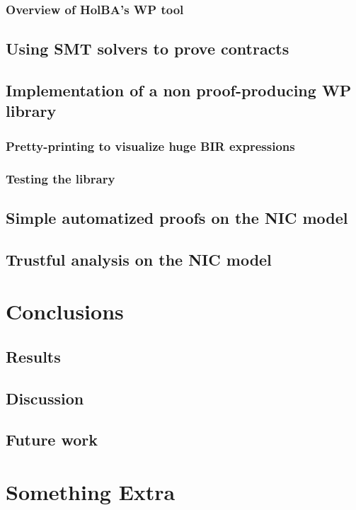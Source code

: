 \documentclass{kththesis}
\begin{document}


\subsection{Overview of HolBA's WP tool}

\section{Using SMT solvers to prove contracts}

\section{Implementation of a non proof-producing WP library}
\subsection{Pretty-printing to visualize huge BIR expressions}
\subsection{Testing the library}

\section{Simple automatized proofs on the NIC model}

\section{Trustful analysis on the NIC model}


\chapter{Conclusions}

\section{Results}

\section{Discussion}

\section{Future work}

\printbibliography[heading=bibintoc]

\appendix

\chapter{Something Extra}

\tailmatter %
\end{document}

